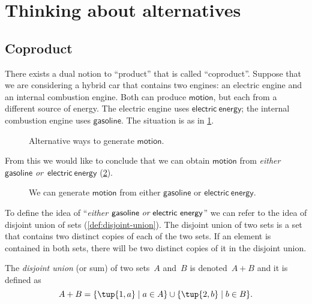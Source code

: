 \section{Thinking about alternatives}
\label{sec:coproductset}
\subsection{Coproduct}

There exists a dual notion to ``product'' that is called ``coproduct''. Suppose that we are considering a hybrid car that contains two engines: an
electric engine and an internal combustion engine. Both can produce $\mathsf{motion}$, but each from a different source of energy. The electric engine uses $\mathsf{electric}\ \mathsf{energy}$; the internal combustion engine uses $\mathsf{gasoline}$. The situation is as in \cref{fig:e16a}.

\begin{figure}[h!]
    \centering
    \caption{Alternative ways to generate $\mathsf{motion}$. \label{fig:e16a}}
\end{figure}

From this we would like to conclude that we can obtain $\mathsf{motion}$ from \emph{either}~$\mathsf{gasoline}$ \emph{or}~$\mathsf{electric}\ \mathsf{energy}$ (\cref{fig:e16b}).

\begin{figure}[h!]
    \centering
    \caption{We can generate $\mathsf{motion}$ from either $\mathsf{gasoline}$ or $\mathsf{electric} \ \mathsf{energy}$. \label{fig:e16b}}
\end{figure}

To define the idea of ``\emph{either $\mathsf{gasoline}\ \emph{or} \ \mathsf{electric}\ \mathsf{energy}$}'' we can refer to the idea of disjoint union of sets (\cref{def:disjoint-union}). The disjoint union of two sets is a set that contains two distinct copies of each of the two sets. If an element is contained in both sets, there will be two distinct copies of it in the disjoint union.

\begin{definition}
\label{def:disjoint-union}
    The \emph{disjoint union} (or sum) of two sets~$A$ and~$B$ is denoted~$A + B$
    and it is defined as
    \begin{equation}
        A + B=\{\tup{1,a}\mid a\in A\}\cup\{\tup{2,b}\mid b\in B\}.
    \end{equation}
\end{definition}

